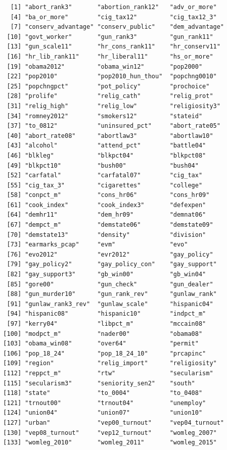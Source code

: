 \documentclass[12pt,oneside]{reedthesis}
\theoremstyle{definition}
\theoremstyle{definition}
\theoremstyle{definition}
\theoremstyle{remark}
\begin{document}
  \begin{verbatim}
    [1] "abort_rank3"       "abortion_rank12"   "adv_or_more"      
    [4] "ba_or_more"        "cig_tax12"         "cig_tax12_3"      
    [7] "conserv_advantage" "conserv_public"    "dem_advantage"    
   [10] "govt_worker"       "gun_rank3"         "gun_rank11"       
   [13] "gun_scale11"       "hr_cons_rank11"    "hr_conserv11"     
   [16] "hr_lib_rank11"     "hr_liberal11"      "hs_or_more"       
   [19] "obama2012"         "obama_win12"       "pop2000"          
   [22] "pop2010"           "pop2010_hun_thou"  "popchng0010"      
   [25] "popchngpct"        "pot_policy"        "prochoice"        
   [28] "prolife"           "relig_cath"        "relig_prot"       
   [31] "relig_high"        "relig_low"         "religiosity3"     
   [34] "romney2012"        "smokers12"         "stateid"          
   [37] "to_0812"           "uninsured_pct"     "abort_rate05"     
   [40] "abort_rate08"      "abortlaw3"         "abortlaw10"       
   [43] "alcohol"           "attend_pct"        "battle04"         
   [46] "blkleg"            "blkpct04"          "blkpct08"         
   [49] "blkpct10"          "bush00"            "bush04"           
   [52] "carfatal"          "carfatal07"        "cig_tax"          
   [55] "cig_tax_3"         "cigarettes"        "college"          
   [58] "conpct_m"          "cons_hr06"         "cons_hr09"        
   [61] "cook_index"        "cook_index3"       "defexpen"         
   [64] "demhr11"           "dem_hr09"          "demnat06"         
   [67] "dempct_m"          "demstate06"        "demstate09"       
   [70] "demstate13"        "density"           "division"         
   [73] "earmarks_pcap"     "evm"               "evo"              
   [76] "evo2012"           "evr2012"           "gay_policy"       
   [79] "gay_policy2"       "gay_policy_con"    "gay_support"      
   [82] "gay_support3"      "gb_win00"          "gb_win04"         
   [85] "gore00"            "gun_check"         "gun_dealer"       
   [88] "gun_murder10"      "gun_rank_rev"      "gunlaw_rank"      
   [91] "gunlaw_rank3_rev"  "gunlaw_scale"      "hispanic04"       
   [94] "hispanic08"        "hispanic10"        "indpct_m"         
   [97] "kerry04"           "libpct_m"          "mccain08"         
  [100] "modpct_m"          "nader00"           "obama08"          
  [103] "obama_win08"       "over64"            "permit"           
  [106] "pop_18_24"         "pop_18_24_10"      "prcapinc"         
  [109] "region"            "relig_import"      "religiosity"      
  [112] "reppct_m"          "rtw"               "secularism"       
  [115] "secularism3"       "seniority_sen2"    "south"            
  [118] "state"             "to_0004"           "to_0408"          
  [121] "trnout00"          "trnout04"          "unemploy"         
  [124] "union04"           "union07"           "union10"          
  [127] "urban"             "vep00_turnout"     "vep04_turnout"    
  [130] "vep08_turnout"     "vep12_turnout"     "womleg_2007"      
  [133] "womleg_2010"       "womleg_2011"       "womleg_2015"      
  \end{verbatim}
\end{document}
